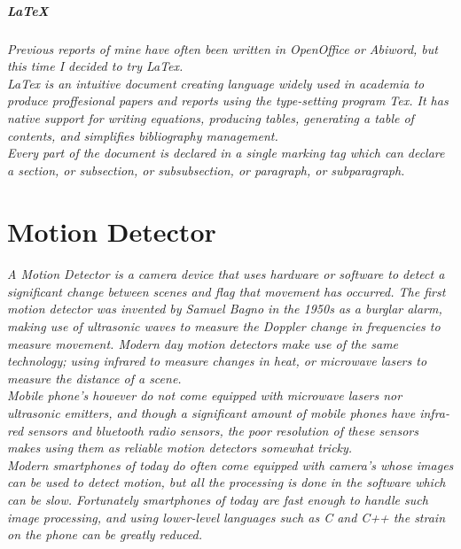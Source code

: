 \documentclass[11pt]{article} %
\begin{document}
\subsubsection{\LaTeX{}}
\paragraph{Previous reports of mine have often been written in OpenOffice or Abiword, but this time I decided to try LaTex.\\LaTex is an intuitive document creating language widely used in academia to produce proffesional papers and reports using the type-setting program Tex. It has native support for writing equations, producing tables, generating a table of contents, and simplifies bibliography management.\\Every part of the document is declared in a single marking tag which can declare a section, or subsection, or subsubsection, or paragraph, or subparagraph.}
\part{Motion Detector}
\paragraph{A Motion Detector is a camera device that uses hardware or software to detect a significant change between scenes and flag that movement has occurred. The first motion detector was invented by Samuel Bagno in the 1950s as a burglar alarm, making use of ultrasonic waves to measure the Doppler change in frequencies to measure movement. Modern day motion detectors make use of the same technology; using infrared to measure changes in heat, or microwave lasers to measure the distance of a scene.\\
Mobile phone's however do not come equipped with microwave lasers nor ultrasonic emitters, and though a significant amount of mobile phones have infra-red sensors and bluetooth radio sensors, the poor resolution of these sensors makes using them as reliable motion detectors somewhat tricky.\\
Modern smartphones of today do often come equipped with camera's whose images can be used to detect motion, but all the processing is done in the software which can be slow. Fortunately smartphones of today are fast enough to handle such image processing, and using lower-level languages such as C and C++ the strain on the phone can be greatly reduced.}
\end{document}
